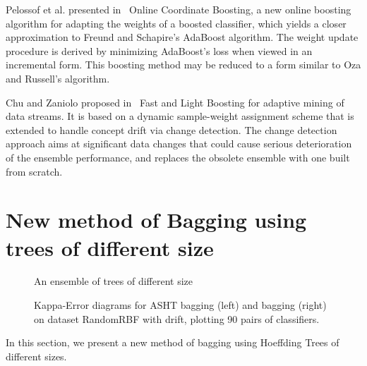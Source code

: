 Pelossof et al. presented in~\cite{OCBoost} Online Coordinate Boosting, a new
online boosting algorithm for adapting the weights of a boosted classifier, which
yields a closer approximation to Freund and Schapire's AdaBoost algorithm.
The weight update procedure is derived by minimizing AdaBoost's loss when viewed in an incremental
form. This boosting method may be reduced to a form similar to Oza and Russell's algorithm.
\ENDOMIT

\BEGINOMIT
Chu and Zaniolo proposed in~\cite{FLBoost} Fast and Light Boosting for adaptive mining
of data streams. It is based on a dynamic sample-weight assignment scheme that is extended
to handle concept drift via change detection. The change detection approach aims at 
significant data changes that could cause serious deterioration of the ensemble performance,
and replaces the obsolete ensemble with one built from scratch.
\ENDOMIT

\section{New method of Bagging using trees of different size}
\label{hast}

\begin{figure}
\begin{center}
\end{center}

\caption{An ensemble of trees of different size}
\label{fig:trees}
\end{figure}


\begin{figure}
\begin{center} 

\end{center}
\caption{Kappa-Error diagrams for ASHT bagging (left) and bagging (right) on dataset RandomRBF with drift,
plotting 90 pairs of classifiers.}

\label{fig:kappa}
\end{figure}
\BEGINOMIT
In this section, we present a new method of bagging using Hoeffding Trees of different sizes.

